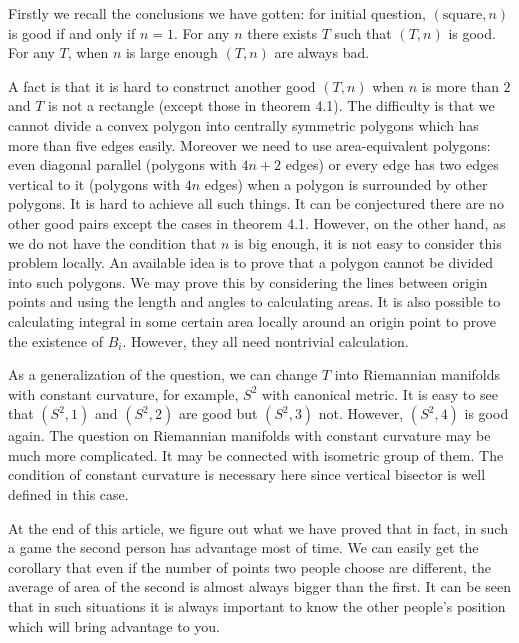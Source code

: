Firstly we recall the conclusions we have gotten: for initial question,
$(\text{square}, n)$ is good if and only if $n=1$. For any $n$ there exists 
$T$ such that $(T,n)$ is good. For any $T$, when $n$ is large enough 
$(T,n)$ are always bad.
 	
	
A fact is that it is hard to construct another good $(T, n)$ when $n$ 
is more than $2$ and $T$ is not a rectangle (except those in 
theorem 4.1). The difficulty is that we cannot divide a convex polygon 
into centrally symmetric polygons which has more than five edges easily. 
Moreover we need to use area-equivalent polygons: even 
diagonal parallel (polygons with $4n+2$ edges) or every edge has two edges
vertical to it (polygons with $4n$ edges) when a polygon is surrounded by 
other polygons. It is hard to achieve all such things. It can be conjectured 
there are no other good pairs except the cases in theorem 4.1. 
However, on the other hand, as we do not have the condition that $n$ is big enough, 
it is not easy to consider this problem locally. 
An available idea is to prove that a polygon cannot be divided into such polygons. 
We may prove this by considering the lines between origin points
and using the length and angles to calculating areas. 
It is also possible to calculating 
integral in some certain area locally around an origin point to prove 
the existence of $B_i$. However, they all need nontrivial calculation.
	
As a generalization of the question, we can change $T$ into Riemannian 
manifolds with constant curvature, for example, $S^2$ with canonical metric.
It is easy to see that $(S^2, 1)$ and $(S^2, 2)$ are good but $(S^2, 3)$ not.
However, $(S^2,4)$ is good again. The question on Riemannian manifolds 
with constant curvature may be much more complicated. It may be connected 
with isometric group of them.
The condition of constant curvature is necessary here since vertical bisector
is well defined in this case.
	
At the end of this article, we figure out what we have proved that in fact, 
in such a game the second person has advantage most of time. We can 
easily get the corollary that even if the number of points two people 
choose are different, the average of area of the second is almost always 
bigger than the first. It can be seen that in such situations it is always 
important to know the other people's position which will bring advantage 
to you.